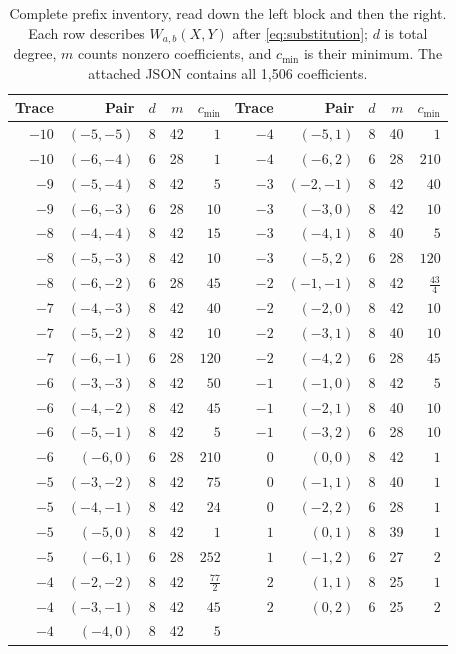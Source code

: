 \documentclass[11pt]{article}
\begin{document}
\begin{table}[htbp]
\centering
\caption{Complete prefix inventory, read down the left block and then the right.
Each row describes $W_{a,b}(X,Y)$ after \eqref{eq:substitution}; $d$ is total degree,
$m$ counts nonzero coefficients, and $c_{\min}$ is their minimum. The attached
JSON contains all 1,506 coefficients.}\label{tab:prefixes}
\small
\begin{tabular}{rrrrr@{\qquad}rrrrr}
\toprule
Trace & Pair & $d$ & $m$ & $c_{\min}$ & Trace & Pair & $d$ & $m$ & $c_{\min}$\\
\midrule
$-10$ & $(-5,-5)$ & 8 & 42 & $1$ & $-4$ & $(-5,1)$ & 8 & 40 & $1$ \\
$-10$ & $(-6,-4)$ & 6 & 28 & $1$ & $-4$ & $(-6,2)$ & 6 & 28 & $210$ \\
$-9$ & $(-5,-4)$ & 8 & 42 & $5$ & $-3$ & $(-2,-1)$ & 8 & 42 & $40$ \\
$-9$ & $(-6,-3)$ & 6 & 28 & $10$ & $-3$ & $(-3,0)$ & 8 & 42 & $10$ \\
$-8$ & $(-4,-4)$ & 8 & 42 & $15$ & $-3$ & $(-4,1)$ & 8 & 40 & $5$ \\
$-8$ & $(-5,-3)$ & 8 & 42 & $10$ & $-3$ & $(-5,2)$ & 6 & 28 & $120$ \\
$-8$ & $(-6,-2)$ & 6 & 28 & $45$ & $-2$ & $(-1,-1)$ & 8 & 42 & $\tfrac{43}{4}$ \\
$-7$ & $(-4,-3)$ & 8 & 42 & $40$ & $-2$ & $(-2,0)$ & 8 & 42 & $10$ \\
$-7$ & $(-5,-2)$ & 8 & 42 & $10$ & $-2$ & $(-3,1)$ & 8 & 40 & $10$ \\
$-7$ & $(-6,-1)$ & 6 & 28 & $120$ & $-2$ & $(-4,2)$ & 6 & 28 & $45$ \\
$-6$ & $(-3,-3)$ & 8 & 42 & $50$ & $-1$ & $(-1,0)$ & 8 & 42 & $5$ \\
$-6$ & $(-4,-2)$ & 8 & 42 & $45$ & $-1$ & $(-2,1)$ & 8 & 40 & $10$ \\
$-6$ & $(-5,-1)$ & 8 & 42 & $5$ & $-1$ & $(-3,2)$ & 6 & 28 & $10$ \\
$-6$ & $(-6,0)$ & 6 & 28 & $210$ & $0$ & $(0,0)$ & 8 & 42 & $1$ \\
$-5$ & $(-3,-2)$ & 8 & 42 & $75$ & $0$ & $(-1,1)$ & 8 & 40 & $1$ \\
$-5$ & $(-4,-1)$ & 8 & 42 & $24$ & $0$ & $(-2,2)$ & 6 & 28 & $1$ \\
$-5$ & $(-5,0)$ & 8 & 42 & $1$ & $1$ & $(0,1)$ & 8 & 39 & $1$ \\
$-5$ & $(-6,1)$ & 6 & 28 & $252$ & $1$ & $(-1,2)$ & 6 & 27 & $2$ \\
$-4$ & $(-2,-2)$ & 8 & 42 & $\tfrac{77}{2}$ & $2$ & $(1,1)$ & 8 & 25 & $1$ \\
$-4$ & $(-3,-1)$ & 8 & 42 & $45$ & $2$ & $(0,2)$ & 6 & 25 & $2$ \\
$-4$ & $(-4,0)$ & 8 & 42 & $5$ &  & & & &  \\
\bottomrule
\end{tabular}
\end{table}
\end{document}
